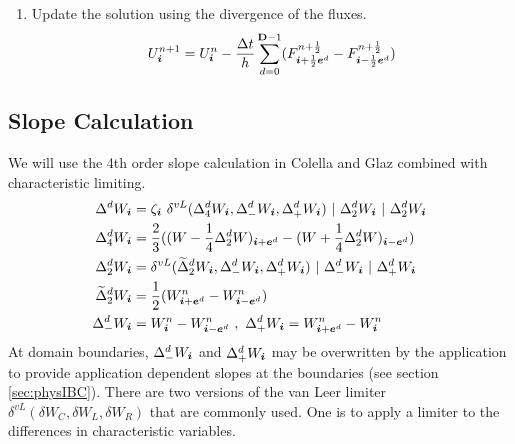 \begin{enumerate}
\item Update the solution using the divergence of the fluxes.
\begin{equation} \label{eqn:updateCons}
U^{n+1}_{\boldsymbol{i}} = U^n_{{\boldsymbol{i}}} - \frac{\Delta t}{h}\sum\limits^{{\mathbf{D}} - 1}_{d=0} 
( F^{n+\frac{1}{2}}_{{\boldsymbol{i}} + \frac{1}{2} {\boldsymbol{e}}^d} -
  F^{n+\frac{1}{2}}_{{\boldsymbol{i}} - \frac{1}{2} {\boldsymbol{e}}^d} )
\end{equation}
\end{enumerate}

\subsection{Slope Calculation} \label{sec:slopeCalculation}

We will use the 4th order slope calculation in Colella and Glaz
\cite{ColellaGlaz} combined with characteristic limiting.
\begin{alignat*}{1}
\Delta^d W_{\boldsymbol{i}}
= & \; \zeta_{\boldsymbol{i}} ~ \delta^{vL}(\Delta^d_4 W_{\boldsymbol{i}},
                                  \Delta^d_- W_{\boldsymbol{i}},
                                  \Delta^d_+ W_{\boldsymbol{i}})
                ~ | ~ \Delta^d_2 W_{\boldsymbol{i}}
                ~ | ~ \Delta^d_2 W_{\boldsymbol{i}} \\
\Delta^d_4 W_{\boldsymbol{i}}
= & \; \frac{2}{3} ((W - \frac{1}{4}\Delta^d_2 W)_{{\boldsymbol{i}} + {\boldsymbol{e}}^d} -
                    (W + \frac{1}{4}\Delta^d_2 W)_{{\boldsymbol{i}} - {\boldsymbol{e}}^d}) \\
\Delta^d_2 W_{\boldsymbol{i}}
= & \; \delta^{vL}(\widetilde{\Delta}^d_2 W_{\boldsymbol{i}},
                   \Delta^d_- W_{\boldsymbol{i}},
                   \Delta^d_+ W_{\boldsymbol{i}})
 ~ | ~ \Delta^d_- W_{\boldsymbol{i}}
 ~ | ~ \Delta^d_+ W_{\boldsymbol{i}} \\
\widetilde{\Delta}^d_2 W_{\boldsymbol{i}}
= & \; \frac{1}{2}(W^n_{{\boldsymbol{i}} + {\boldsymbol{e}}^d} - W^n_{{\boldsymbol{i}} - {\boldsymbol{e}}^d}) \\
\Delta^d_- W_{\boldsymbol{i}}
= & \; W^n_{\boldsymbol{i}} - W^n_{{\boldsymbol{i}} - {\boldsymbol{e}}^d} ~ , ~
\Delta^d_+ W_{\boldsymbol{i}}
=      W^n_{{\boldsymbol{i}} + {\boldsymbol{e}}^d} - W^n_{\boldsymbol{i}}
\end{alignat*}
At domain boundaries, $\Delta^d_- W_{\boldsymbol{i}}$ and $\Delta^d_+ W_{\boldsymbol{i}}$
may be overwritten by the application to provide application dependent
slopes at the boundaries (see section \ref{sec:physIBC}).
There are two versions of the van Leer limiter 
$\delta^{vL}(\delta W_C, \delta W_L, \delta W_R)$ that are commonly used. 
One is to apply a limiter to the differences in characteristic
variables.

